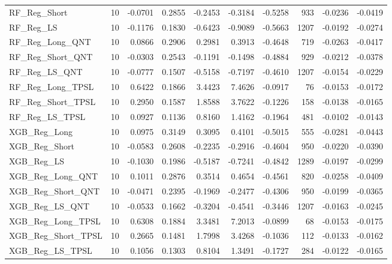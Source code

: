 \begin{tabular}{llrrrrrrrr}
\cline{1-10}
RF\_Reg\_Short & 10 & -0.0701 & 0.2855 & -0.2453 & -0.3184 & -0.5258 & 933 & -0.0236 & -0.0419 \\
\cline{1-10}
RF\_Reg\_LS & 10 & -0.1176 & 0.1830 & -0.6423 & -0.9089 & -0.5663 & 1207 & -0.0192 & -0.0274 \\
\cline{1-10}
RF\_Reg\_Long\_QNT & 10 & 0.0866 & 0.2906 & 0.2981 & 0.3913 & -0.4648 & 719 & -0.0263 & -0.0417 \\
\cline{1-10}
RF\_Reg\_Short\_QNT & 10 & -0.0303 & 0.2543 & -0.1191 & -0.1498 & -0.4884 & 929 & -0.0212 & -0.0378 \\
\cline{1-10}
RF\_Reg\_LS\_QNT & 10 & -0.0777 & 0.1507 & -0.5158 & -0.7197 & -0.4610 & 1207 & -0.0154 & -0.0229 \\
\cline{1-10}
RF\_Reg\_Long\_TPSL & 10 & 0.6422 & 0.1866 & 3.4423 & 7.4626 & -0.0917 & 76 & -0.0153 & -0.0172 \\
\cline{1-10}
RF\_Reg\_Short\_TPSL & 10 & 0.2950 & 0.1587 & 1.8588 & 3.7622 & -0.1226 & 158 & -0.0138 & -0.0165 \\
\cline{1-10}
RF\_Reg\_LS\_TPSL & 10 & 0.0927 & 0.1136 & 0.8160 & 1.4162 & -0.1964 & 481 & -0.0102 & -0.0143 \\
\cline{1-10}
XGB\_Reg\_Long & 10 & 0.0975 & 0.3149 & 0.3095 & 0.4101 & -0.5015 & 555 & -0.0281 & -0.0443 \\
\cline{1-10}
XGB\_Reg\_Short & 10 & -0.0583 & 0.2608 & -0.2235 & -0.2916 & -0.4604 & 950 & -0.0220 & -0.0390 \\
\cline{1-10}
XGB\_Reg\_LS & 10 & -0.1030 & 0.1986 & -0.5187 & -0.7241 & -0.4842 & 1289 & -0.0197 & -0.0299 \\
\cline{1-10}
XGB\_Reg\_Long\_QNT & 10 & 0.1011 & 0.2876 & 0.3514 & 0.4654 & -0.4561 & 820 & -0.0258 & -0.0409 \\
\cline{1-10}
XGB\_Reg\_Short\_QNT & 10 & -0.0471 & 0.2395 & -0.1969 & -0.2477 & -0.4306 & 950 & -0.0199 & -0.0365 \\
\cline{1-10}
XGB\_Reg\_LS\_QNT & 10 & -0.0533 & 0.1662 & -0.3204 & -0.4541 & -0.3446 & 1207 & -0.0163 & -0.0245 \\
\cline{1-10}
XGB\_Reg\_Long\_TPSL & 10 & 0.6308 & 0.1884 & 3.3481 & 7.2013 & -0.0899 & 68 & -0.0153 & -0.0175 \\
\cline{1-10}
XGB\_Reg\_Short\_TPSL & 10 & 0.2665 & 0.1481 & 1.7998 & 3.4268 & -0.1036 & 112 & -0.0133 & -0.0162 \\
\cline{1-10}
XGB\_Reg\_LS\_TPSL & 10 & 0.1056 & 0.1303 & 0.8104 & 1.3491 & -0.1727 & 284 & -0.0122 & -0.0165 \\
\cline{1-10}

\end{tabular}
